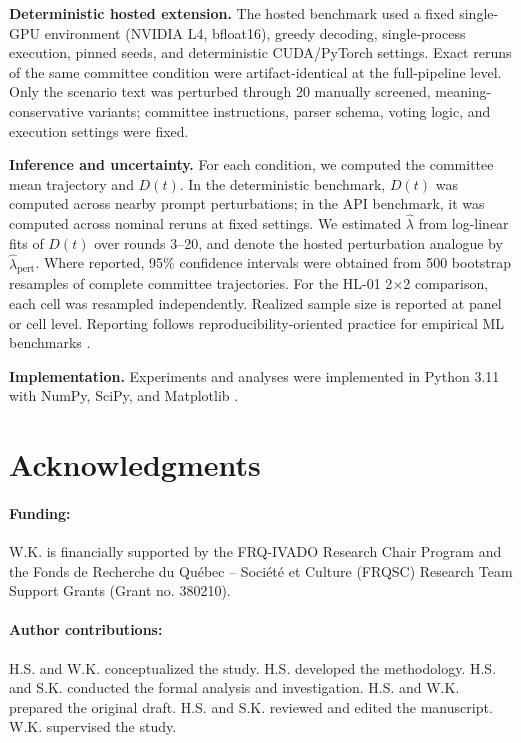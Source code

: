 \documentclass[12pt]{article}
\newcommand{\lam}{\ensuremath{\hat{\lambda}}}
\begin{document}
\textbf{Deterministic hosted extension.} The hosted benchmark used a fixed
single-GPU environment (NVIDIA L4, bfloat16), greedy decoding, single-process
execution, pinned seeds, and deterministic CUDA/PyTorch settings. Exact reruns
of the same committee condition were artifact-identical at the full-pipeline
level. Only the scenario text was perturbed through 20 manually screened,
meaning-conservative variants; committee instructions, parser schema, voting
logic, and execution settings were fixed.

\textbf{Inference and uncertainty.} For each condition, we computed the
committee mean trajectory and $D(t)$. In the deterministic benchmark, $D(t)$ was
computed across nearby prompt perturbations; in the API benchmark, it was
computed across nominal reruns at fixed settings. We estimated $\lam$ from
log-linear fits of $D(t)$ over rounds 3--20, and denote the hosted perturbation
analogue by $\hat{\lambda}_{\mathrm{pert}}$. Where reported, 95\% confidence
intervals were obtained from 500 bootstrap resamples of complete committee
trajectories. For the HL-01 2$\times$2 comparison, each cell was resampled
independently. Realized sample size is reported at panel or cell level. Reporting
follows reproducibility-oriented practice for empirical ML benchmarks
\cite{pineau2021improving}.

\textbf{Implementation.} Experiments and analyses were implemented in Python
3.11 with NumPy, SciPy, and Matplotlib \cite{scipy2020,matplotlib2007}.

\clearpage



\section*{Acknowledgments}
\paragraph*{Funding:}
W.K. is financially supported by the FRQ-IVADO Research Chair Program and the
Fonds de Recherche du Québec -- Société et Culture (FRQSC) Research Team Support
Grants (Grant no. 380210).
\paragraph*{Author contributions:}
H.S. and W.K. conceptualized the study. H.S. developed the methodology. H.S. and
S.K. conducted the formal analysis and investigation. H.S. and W.K. prepared the
original draft. H.S. and S.K. reviewed and edited the manuscript. W.K.
supervised the study.
\end{document}
